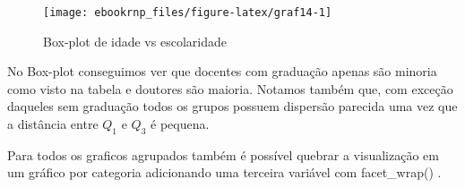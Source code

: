 \documentclass[11pt,]{style/krantz}
\makeatletter
\newenvironment{Shaded}{\begin{snugshade}}{\end{snugshade}}
\newcommand{\DataTypeTok}[1]{\textcolor[rgb]{0.13,0.29,0.53}{#1}}
\newcommand{\KeywordTok}[1]{\textcolor[rgb]{0.13,0.29,0.53}{\textbf{#1}}}
\newcommand{\NormalTok}[1]{#1}
\newcommand{\OperatorTok}[1]{\textcolor[rgb]{0.81,0.36,0.00}{\textbf{#1}}}
\newcommand{\OtherTok}[1]{\textcolor[rgb]{0.56,0.35,0.01}{#1}}
\newcommand{\StringTok}[1]{\textcolor[rgb]{0.31,0.60,0.02}{#1}}
\renewenvironment{quote}{\begin{VF}}{\end{VF}}
\newenvironment{kframe}{%
\medskip{}
\setlength{\fboxsep}{.8em}
 \def\at@end@of@kframe{}%
 \ifinner\ifhmode%
  \def\at@end@of@kframe{\end{minipage}}%
  \begin{minipage}{\columnwidth}%
 \fi\fi%
 \def\FrameCommand##1{\hskip\@totalleftmargin \hskip-\fboxsep
 \colorbox{shadecolor}{##1}\hskip-\fboxsep
     \hskip-\linewidth \hskip-\@totalleftmargin \hskip\columnwidth}%
 \MakeFramed {\advance\hsize-\width
   \@totalleftmargin\z@ \linewidth\hsize
   \@setminipage}}%
 {\par\unskip\endMakeFramed%
 \at@end@of@kframe}
\renewenvironment{Shaded}{\begin{kframe}}{\end{kframe}}
\theoremstyle{definition}
\theoremstyle{definition}
\theoremstyle{definition}
\theoremstyle{remark}
\makeatother
\begin{document}
\begin{Shaded}
\end{Shaded}

\begin{figure}[H]

{\centering \texttt{[image: ebookrnp\_files/figure-latex/graf14-1]}

}

\caption{Box-plot de idade vs escolaridade}\label{fig:graf14}
\end{figure}

No Box-plot conseguimos ver que docentes com graduação apenas são minoria como visto na tabela e doutores são maioria. Notamos também que, com exceção daqueles sem graduação todos os grupos possuem dispersão parecida uma vez que a distância entre \(Q_1\) e \(Q_3\) é pequena.

\begin{quote}
Para todos os graficos agrupados também é possível quebrar a visualização em um gráfico por categoria adicionando uma terceira variável com facet\_wrap() .
\end{quote}
\end{document}
